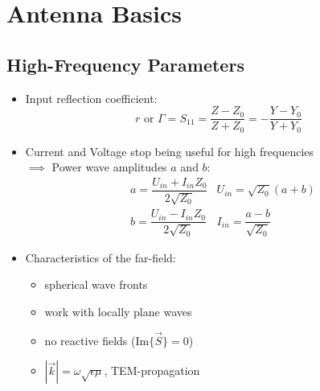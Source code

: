 \section{Antenna Basics}
\subsection{High-Frequency Parameters}
\begin{itemize}
    \itemsep0pt
    \item Input reflection coefficient:\\
        \[r \text{ or } \Gamma = S_{11} = \dfrac{Z - Z_0}{Z + Z_0} = -\dfrac{Y - Y_0}{Y + Y_0}\]
    \item Current and Voltage stop being useful for high frequencies\\
        $\implies$ Power wave amplitudes $a$ and $b$:
    \begin{align*}
        &a = \dfrac{U_{in} + I_{in}Z_0}{2\sqrt{Z_0}} & U_{in} = \sqrt{Z_0} (a + b)\\
        &b = \dfrac{U_{in} - I_{in}Z_0}{2\sqrt{Z_0}} & I_{in} = \dfrac{a - b}{\sqrt{Z_0}}
    \end{align*}
    \item Characteristics of the far-field:
        \begin{itemize}
            \itemsep0pt
            \item spherical wave fronts
            \item work with locally plane waves
            \item no reactive fields (\(\mathrm{Im}\{\vec{S}\} = 0\))
            \item \(|\vec{k}| = \omega \sqrt{\epsilon\mu}\), TEM-propagation
        \end{itemize}

\end{itemize}

